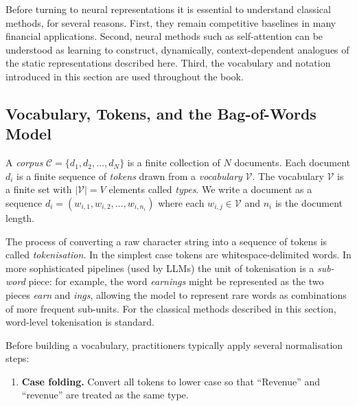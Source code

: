 \begin{deepdive}

Before turning to neural representations it is essential to understand classical methods,
for several reasons.  First, they remain competitive baselines in many financial
applications.  Second, neural methods such as self-attention can be understood as
learning to construct, dynamically, context-dependent analogues of the static
representations described here.  Third, the vocabulary and notation introduced in this
section are used throughout the book.

\subsection{Vocabulary, Tokens, and the Bag-of-Words Model}
\label{sec:classical-bow}

\begin{definition}
\label{def:corpus-vocab}
A \emph{corpus} $\mathcal{C} = \{d_1, d_2, \ldots, d_N\}$ is a finite collection of
$N$ documents.  Each document $d_i$ is a finite sequence of \emph{tokens} drawn from a
\emph{vocabulary} $\mathcal{V}$.  The vocabulary $\mathcal{V}$ is a finite set with
$|\mathcal{V}| = V$ elements called \emph{types}.  We write a document as a sequence
$d_i = (w_{i,1}, w_{i,2}, \ldots, w_{i,n_i})$ where each $w_{i,j} \in \mathcal{V}$
and $n_i$ is the document length.
\end{definition}

The process of converting a raw character string into a sequence of tokens is called
\emph{tokenisation}.  In the simplest case tokens are whitespace-delimited words.
In more sophisticated pipelines (used by LLMs) the unit of tokenisation is a
\emph{sub-word} piece: for example, the word \textit{earnings} might be represented
as the two pieces \textit{earn} and \textit{ings}, allowing the model to represent
rare words as combinations of more frequent sub-units.  For the classical methods
described in this section, word-level tokenisation is standard.

Before building a vocabulary, practitioners typically apply several normalisation steps:

\begin{enumerate}
  \item \textbf{Case folding.} Convert all tokens to lower case so that ``Revenue'' and
    ``revenue'' are treated as the same type.


\end{enumerate}
\end{deepdive}
